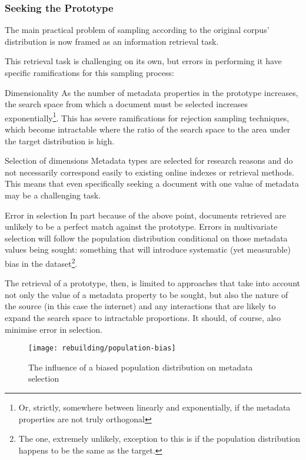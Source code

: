 \subsubsection{Seeking the Prototype}
The main practical problem of sampling according to the original corpus' distribution is now framed as an information retrieval task.

This retrieval task is challenging on its own, but errors in performing it have specific ramifications for this sampling process:

\begin{itemizeTitle}
    \item[Dimensionality]As the number of metadata properties in the prototype increases, the search space from which a document must be selected increases exponentially\footnote{Or, strictly, somewhere between linearly and exponentially, if the metadata properties are not truly orthogonal}.  This has severe ramifications for rejection sampling techniques, which become intractable where the ratio of the search space to the area under the target distribution is high.

    \item[Selection of dimensions]Metadata types are selected for research reasons and do not necessarily correspond easily to existing online indexes or retrieval methods.  This means that even specifically seeking a document with one value of metadata may be a challenging task.

    \item[Error in selection]In part because of the above point, documents retrieved are unlikely to be a perfect match against the prototype.  Errors in multivariate selection will follow the population distribution conditional on those metadata values being sought: something that will introduce systematic (yet measurable) bias in the dataset\footnote{The one, extremely unlikely, exception to this is if the population distribution happens to be the same as the target.}.
\end{itemizeTitle}

The retrieval of a prototype, then, is limited to approaches that take into account not only the value of a metadata property to be sought, but also the nature of the source (in this case the internet) and any interactions that are likely to expand the search space to intractable proportions.  It should, of course, also minimise error in selection.


\begin{figure}[h]
    \centering
    \texttt{[image: rebuilding/population-bias]}
    \caption{The influence of a biased population distribution on metadata selection}
    \label{fig:rebuilding:population-bias}
\end{figure}


